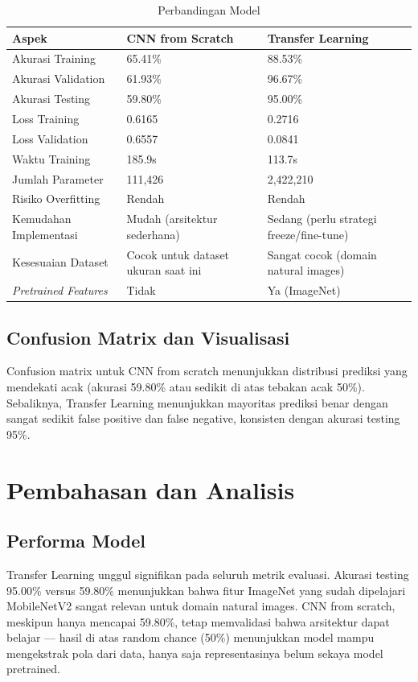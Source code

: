 \documentclass[conference]{IEEEtran}
\begin{document}
\begin{table}[htbp]
\caption{Perbandingan Model}
\centering
\footnotesize
\begin{tabular}{p{3cm}p{2.8cm}p{3cm}}
\toprule
\textbf{Aspek} & \textbf{CNN from Scratch} & \textbf{Transfer Learning} \\
\midrule
Akurasi Training & 65.41\% & 88.53\% \\
Akurasi Validation & 61.93\% & 96.67\% \\
Akurasi Testing & 59.80\% & 95.00\% \\
Loss Training & 0.6165 & 0.2716 \\
Loss Validation & 0.6557 & 0.0841 \\
Waktu Training & 185.9s & 113.7s \\
Jumlah Parameter & 111,426 & 2,422,210 \\
Risiko Overfitting & Rendah & Rendah \\
Kemudahan Implementasi & Mudah (arsitektur sederhana) & Sedang (perlu strategi freeze/fine-tune) \\
Kesesuaian Dataset & Cocok untuk dataset ukuran saat ini & Sangat cocok (domain natural images) \\
\textit{Pretrained Features} & Tidak & Ya (ImageNet) \\
\bottomrule
\end{tabular}
\label{tab:comparison}
\end{table}

\subsection{Confusion Matrix dan Visualisasi}
Confusion matrix untuk CNN from scratch menunjukkan distribusi prediksi yang mendekati acak (akurasi 59.80\% atau sedikit di atas tebakan acak 50\%). Sebaliknya, Transfer Learning menunjukkan mayoritas prediksi benar dengan sangat sedikit false positive dan false negative, konsisten dengan akurasi testing 95\%.

\section{Pembahasan dan Analisis}
\subsection{Performa Model}
Transfer Learning unggul signifikan pada seluruh metrik evaluasi. Akurasi testing 95.00\% versus 59.80\% menunjukkan bahwa fitur ImageNet yang sudah dipelajari MobileNetV2 sangat relevan untuk domain natural images. CNN from scratch, meskipun hanya mencapai 59.80\%, tetap memvalidasi bahwa arsitektur dapat belajar — hasil di atas random chance (50\%) menunjukkan model mampu mengekstrak pola dari data, hanya saja representasinya belum sekaya model pretrained.
\end{document}
